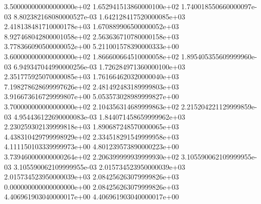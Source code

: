 \documentclass{article}
\begin{document}
\begin{center}
{3.500000000000000000e+02 1.652941513860000100e+02 1.740018550660000097e-03 8.802382168080000527e-03 1.642128417520000085e+03 2.418138481710000178e+03 1.670889906500000052e+03 8.927468042800001058e+02 2.563636710780000158e+03 3.778366090500000052e+00 5.211001578390000333e+00
3.600000000000000000e+02 1.866600664510000058e+02 1.895405355609999960e-03 6.949347044990000256e-03 1.726284971360000100e+03 2.351775925070000085e+03 1.761664620320000040e+03 7.198278628699997626e+02 2.481492483189999803e+03 3.916673616729999807e+00 5.053573028989999827e+00
3.700000000000000000e+02 2.104356314689999863e+02 2.215204221129999859e-03 4.954436122690000083e-03 1.844071458659999962e+03 2.230259302139999818e+03 1.890687248570000065e+03 4.438310429799998929e+02 2.334518291549999958e+03 4.111150103339999973e+00 4.801239573890000223e+00
3.739460000000000264e+02 2.206399999939999930e+02 3.105590062109999955e-03 3.105590062109999955e-03 2.015734523950000039e+03 2.015734523950000039e+03 2.084256263079999826e+03 0.000000000000000000e+00 2.084256263079999826e+03 4.406961903040000017e+00 4.406961903040000017e+00
}
\end{center}
\end{document}
